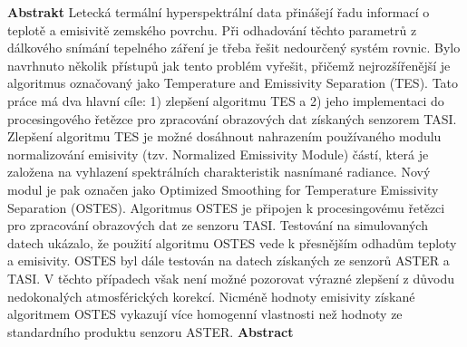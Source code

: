 \documentclass[oneside,12pt]{book}%
\begin{document}


\newpage \hspace*{0.1cm} \thispagestyle{empty}
\newline
\noindent\textbf{Abstrakt}\newline
Letecká termální hyperspektrální data přinášejí řadu informací o teplotě a emisivitě zemského povrchu. Při odhadování těchto parametrů z dálkového snímání tepelného záření je třeba řešit nedourčený systém rovnic. Bylo navrhnuto několik přístupů jak tento problém vyřešit, přičemž nejrozšířenější je algoritmus označovaný jako Temperature and Emissivity Separation (TES). Tato práce má dva hlavní cíle: 1) zlepšení algoritmu TES a 2) jeho implementaci do procesingového řetězce pro zpracování obrazových dat získaných senzorem TASI. Zlepšení algoritmu TES je možné dosáhnout nahrazením používaného modulu normalizování emisivity (tzv. Normalized Emissivity Module) částí, která je založena na vyhlazení spektrálních charakteristik nasnímané radiance. Nový modul je pak označen jako Optimized Smoothing for Temperature Emissivity Separation (OSTES). Algoritmus OSTES je připojen k procesingovému řetězci pro zpracování obrazových dat ze senzoru TASI. Testování na simulovaných datech ukázalo, že použití algoritmu OSTES vede k přesnějším odhadům teploty a emisivity. OSTES byl dále testován na datech získaných ze senzorů ASTER a TASI. V těchto případech však není možné pozorovat výrazné zlepšení z důvodu nedokonalých atmosférických korekcí. Nicméně hodnoty emisivity získané algoritmem OSTES vykazují více homogenní vlastnosti než hodnoty ze standardního produktu senzoru ASTER.
\newline
\newline
\newline
\newline
\noindent\textbf{Abstract}\newline
\end{document}
